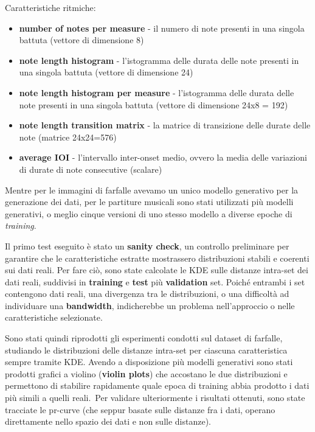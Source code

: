 Caratteristiche ritmiche:
\begin{itemize}
    \item \textbf{number of notes per measure} - il numero di note presenti in una singola battuta (vettore di dimensione 8)
    \item \textbf{note length histogram} - l'istogramma delle durata delle note presenti in una singola battuta (vettore di dimensione 24)
    \item \textbf{note length histogram per measure} - l'istogramma delle durata delle note presenti in una singola battuta (vettore di dimensione 24x8 = 192)
    \item \textbf{note length transition matrix} - la matrice di transizione delle durate delle note (matrice 24x24=576)
    \item \textbf{average IOI} - l'intervallo inter-onset medio, ovvero la media delle variazioni di durate di note consecutive (scalare)
\end{itemize}

Mentre per le immagini di farfalle avevamo un unico modello generativo per la generazione dei dati, per le partiture musicali sono stati utilizzati più modelli generativi, o meglio cinque versioni di uno stesso modello a diverse epoche di  \textit{training}.\

Il primo test eseguito è stato un \textbf{sanity check}, un controllo preliminare per garantire che le caratteristiche estratte mostrassero distribuzioni stabili e coerenti sui dati reali. 
Per fare ciò, sono state calcolate le KDE sulle distanze intra-set dei dati reali, suddivisi in \textbf{training} e \textbf{test} più \textbf{validation} set. Poiché entrambi i set contengono dati reali, una divergenza tra le distribuzioni, o una difficoltà
ad individuare una \textbf{bandwidth}, indicherebbe un problema nell’approccio o nelle caratteristiche selezionate.

Sono stati quindi riprodotti gli esperimenti condotti sul dataset di farfalle, studiando le distribuzioni delle distanze intra-set per ciascuna caratteristica sempre tramite KDE. Avendo a disposizione più modelli generativi sono stati prodotti grafici a violino (\textbf{violin plots}) che accostano le due distribuzioni e permettono di stabilire rapidamente quale epoca di training abbia prodotto i dati più simili a quelli reali.\
Per validare ulteriormente i risultati ottenuti, sono state tracciate le pr-curve (che seppur basate sulle distanze fra i dati, operano direttamente nello spazio dei dati e non sulle distanze).\

